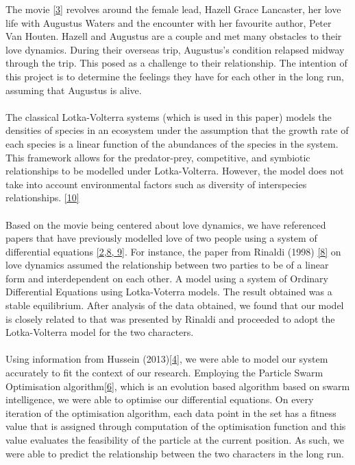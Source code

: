 \documentclass{article}
\begin{document}
The movie  \hyperlink{source3}{[3]} revolves around the female lead, Hazell Grace Lancaster, her love life with Augustus Waters and the encounter with her favourite author, Peter Van Houten. Hazell and Augustus are a couple and met many obstacles to their love dynamics. During their overseas trip, Augustus's condition relapsed midway through the trip. This posed as a challenge to their relationship. The intention of this project is to determine the feelings they have for each other in the long run, assuming that Augustus is alive. \\ \\
The classical Lotka-Volterra systems (which is used in this paper) models the densities of species in an ecosystem under the assumption that the growth rate of each species is a linear function of the abundances of the species in the system. This framework allows for the  predator-prey, competitive, and symbiotic relationships to be modelled under Lotka-Volterra.  However, the model does not take into account environmental factors such as diversity of interspecies relationships.  
\hyperlink{source10}{[10]}\\ \\
Based on the movie being centered about love dynamics, we have referenced papers that have previously modelled love of two people using a system of differential equations \hyperlink{source2}{[2,}\hyperlink{source8}{8,}\hyperlink{source9}{ 9]}. For instance, the paper from Rinaldi (1998) \hyperlink{source8}{[8]} on love dynamics assumed the relationship between two parties to be of a linear form and interdependent on each other. A model using a system of Ordinary Differential Equations using Lotka-Voterra models. The result obtained was a stable equilibrium. After analysis of the data obtained, we found that our model is closely related to that was presented by Rinaldi and proceeded to adopt the Lotka-Volterra model for the two characters. \\ \\
Using information from Hussein (2013)\hyperlink{source4}{[4]}, we were able to model our system accurately to fit the context of our research. Employing the Particle Swarm Optimisation algorithm\hyperlink{source6}{[6]}, which is an evolution based algorithm based on swarm intelligence, we were able to optimise our differential equations. On every iteration of the optimisation algorithm, each data point in the set has a fitness value that is assigned through computation of the optimisation function and this value evaluates the feasibility of the particle at the current position. As such, we were able to predict the relationship between the two characters in the long run. \\
\end{document}
